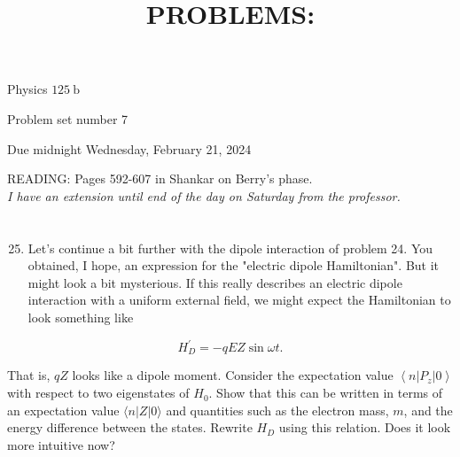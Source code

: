 \documentclass[12pt]{article}
\title{PROBLEMS: }
\author{}
\date{}
\begin{document}
\maketitle
Physics $125 \mathrm{~b}$

Problem set number 7

Due midnight Wednesday, February 21, 2024

READING: Pages 592-607 in Shankar on Berry's phase.\\
\emph{I have an extension until end of the day on Saturday from the professor.}
\section{}
\begin{enumerate}
  \setcounter{enumi}{24}
  \item Let's continue a bit further with the dipole interaction of problem 24. You obtained, I hope, an expression for the "electric dipole Hamiltonian". But it might look a bit mysterious. If this really describes an electric dipole interaction with a uniform external field, we might expect the Hamiltonian to look something like
\end{enumerate}


\begin{equation*}
H_{D}^{\prime}=-q E Z \sin \omega t . \tag{1}
\end{equation*}


That is, $q Z$ looks like a dipole moment. Consider the expectation value $\left\langle n\left|P_{z}\right| 0\right\rangle$ with respect to two eigenstates of $H_{0}$. Show that this can be written in terms of an expectation value $\langle n|Z| 0\rangle$ and quantities such as the electron mass, $m$, and the energy difference between the states. Rewrite $H_{D}$ using this relation. Does it look more intuitive now?
\end{document}
